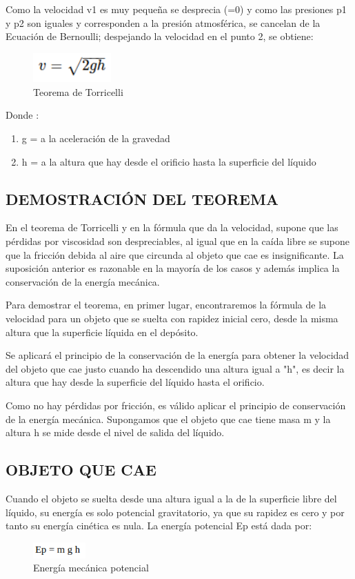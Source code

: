 \documentclass[journal,transmag]{IEEEtran}
\begin{document}
Como la velocidad v1 es muy pequeña se desprecia (=0) y como las presiones p1 y p2  son iguales y corresponden a la presión atmosférica, se cancelan de la Ecuación de Bernoulli; despejando la velocidad en el punto 2, se obtiene: 

  \begin{figure}[!h]
\center
\includegraphics[width=3cm]{imagen9.png}
\caption{Teorema de Torricelli}
\label{8}
\end{figure}
Donde :
\begin{enumerate}[label=(\roman*)]
	
    \item g = a la aceleración de la gravedad
    \item h = a la altura que hay desde el orificio hasta la superficie del líquido 

	\end{enumerate}
\subsection{DEMOSTRACIÓN DEL TEOREMA}
En el teorema de Torricelli y en la fórmula que da la velocidad, supone que las pérdidas por viscosidad son despreciables, al igual que en la caída libre se supone que la fricción debida al aire que circunda al objeto que cae es insignificante. La suposición anterior es razonable en la mayoría de los casos y además implica la conservación de la energía mecánica. 

Para demostrar el teorema, en primer lugar, encontraremos la fórmula de la velocidad para un objeto que se suelta con rapidez inicial cero, desde la misma altura que la superficie líquida en el depósito. 

Se aplicará el principio de la conservación de la energía para obtener la velocidad del objeto que cae justo cuando ha descendido una altura igual a "h", es decir la altura que hay desde la superficie del líquido hasta el orificio. 

Como no hay pérdidas por fricción, es válido aplicar el principio de conservación de la energía mecánica. Supongamos que el objeto que cae tiene masa m y la altura h se mide desde el nivel de salida del líquido. 
\subsection{OBJETO QUE CAE}
Cuando el objeto se suelta desde una altura igual a la de la superficie libre del líquido, su energía es solo potencial gravitatorio, ya que su rapidez es cero y por tanto su energía cinética es nula. La energía potencial Ep está dada por: 
\begin{figure}[!h]
\center
\includegraphics[width=2cm]{imagen10.png}
\caption{Energía mecánica potencial}
\label{f7}
\end{figure}
\end{document}
